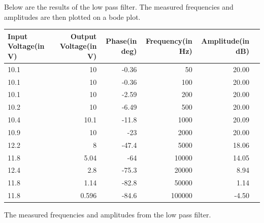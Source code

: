 Below are the results of the low pass filter. The measured frequencies and amplitudes are then plotted on a bode plot.

\begin{adjustwidth}{-2.5 cm}{-2.5 cm}\centering\begin{threeparttable}[!htb]
        \scriptsize
        \begin{tabular}{lrrrrr}\toprule
            \textbf{Input Voltage(in V)} & \textbf{Output Voltage(in V)} & \textbf{Phase(in deg)} & \textbf{Frequency(in Hz)} & \textbf{Amplitude(in dB)} \\\midrule
            10.1                         & 10                            & -0.36                  & 50                        & 20.00                     \\
            10.1                         & 10                            & -0.36                  & 100                       & 20.00                     \\
            10.1                         & 10                            & -2.59                  & 200                       & 20.00                     \\
            10.2                         & 10                            & -6.49                  & 500                       & 20.00                     \\
            10.4                         & 10.1                          & -11.8                  & 1000                      & 20.09                     \\
            10.9                         & 10                            & -23                    & 2000                      & 20.00                     \\
            12.2                         & 8                             & -47.4                  & 5000                      & 18.06                     \\
            11.8                         & 5.04                          & -64                    & 10000                     & 14.05                     \\
            12.4                         & 2.8                           & -75.3                  & 20000                     & 8.94                      \\
            11.8                         & 1.14                          & -82.8                  & 50000                     & 1.14                      \\
            11.8                         & 0.596                         & -84.6                  & 100000                    & -4.50                     \\
            \bottomrule
        \end{tabular}
        \caption{The measured frequencies and amplitudes from the low pass filter.}
    \end{threeparttable}\end{adjustwidth}


